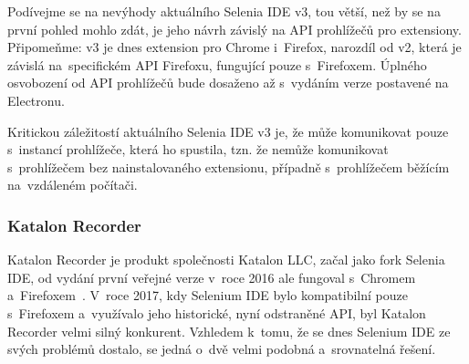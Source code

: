 \documentclass[12pt, a4paper, twoside]{article}
\begin{document}
	\noindent Podívejme se na nevýhody aktuálního Selenia IDE v3, tou větší, než by se na první pohled mohlo zdát, je jeho návrh závislý na API prohlížečů pro extensiony. Připomeňme: v3 je dnes extension pro Chrome i~Firefox, narozdíl od v2, která je závislá na~specifickém API Firefoxu, fungující pouze s~Firefoxem. Úplného osvobození od API prohlížečů bude dosaženo až s~vydáním verze postavené na Electronu.
	
	Kritickou záležitostí aktuálního Selenia IDE v3 je, že může komunikovat pouze s~instancí prohlížeče, která ho spustila, tzn. že nemůže komunikovat s~prohlížečem bez nainstalovaného extensionu, případně s~prohlížečem běžícím na~vzdáleném počítači.
	\subsubsection{Katalon Recorder}
	Katalon Recorder je produkt společnosti Katalon LLC, začal jako fork Selenia IDE, od vydání první veřejné verze v~roce 2016 ale fungoval s~Chromem a~Firefoxem~\cite{katalonRecorderMainPage, katalonRecorderWikipedia}. V~roce 2017, kdy Selenium IDE bylo kompatibilní pouze s~Firefoxem a~využívalo jeho historické, nyní odstraněné API, byl Katalon Recorder velmi silný konkurent. Vzhledem k~tomu, že se dnes Selenium IDE ze svých problémů dostalo, se jedná o~dvě velmi podobná a~srovnatelná řešení.
\end{document}

